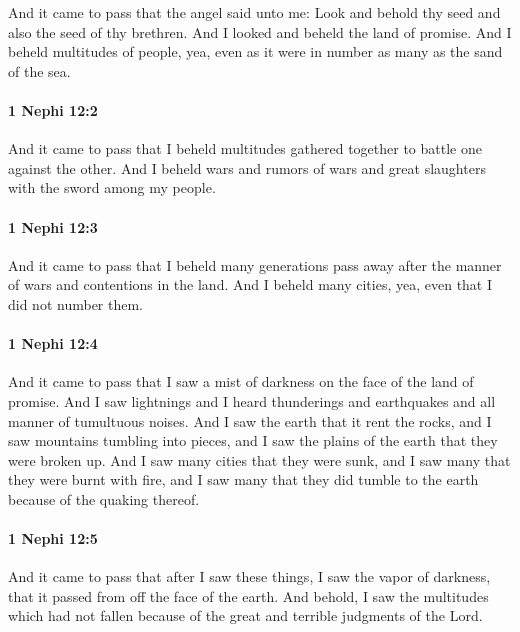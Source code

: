 			And it came to pass that the angel said unto me:
			Look and behold thy seed and also the seed of thy brethren.
			And I looked and beheld the land of promise.
			And I beheld multitudes of people,
			yea, even as it were in number as many as the sand of the sea.

		\paragraph{1 Nephi 12:2} %
			\label{1NEPHI-12-2}

			And it came to pass that I beheld multitudes gathered together
			to battle one against the other.
			And I beheld wars and rumors of wars
			and great slaughters with the sword among my people.

		\paragraph{1 Nephi 12:3} %
			\label{1NEPHI-12-3}

			And it came to pass that I beheld many generations pass away
			after the manner of wars and contentions in the land.
			And I beheld many cities,
			yea, even that I did not number them.

		\paragraph{1 Nephi 12:4} %
			\label{1NEPHI-12-4}

			And it came to pass that I saw a mist of darkness
			on the face of the land of promise.
			And I saw lightnings and I heard thunderings and earthquakes
			and all manner of tumultuous noises.
			And I saw the earth that it rent the rocks,
			and I saw mountains tumbling into pieces,
			and I saw the plains of the earth that they were broken up.
			And I saw many cities that they were sunk,
			and I saw many that they were burnt with fire,
			and I saw many that they did tumble to the earth because of the quaking thereof.

		\paragraph{1 Nephi 12:5} %
			\label{1NEPHI-12-5}

			And it came to pass that after I saw these things,
			I saw the vapor of darkness,
			that it passed from off the face of the earth.
			And behold, I saw the multitudes which had not fallen
			because of the great and terrible judgments of the Lord.

